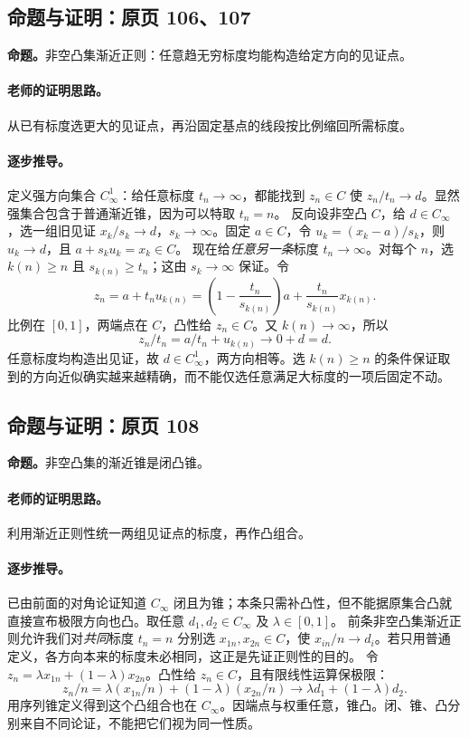 \documentclass[11pt,a4paper]{article}
\theoremstyle{definition}\newtheorem{definition}{定义}\newtheorem{example}{例}
\begin{document}
\subsection{命题与证明：原页 106、107}

\textbf{命题。}非空凸集渐近正则：任意趋无穷标度均能构造给定方向的见证点。

\paragraph{老师的证明思路。}从已有标度选更大的见证点，再沿固定基点的线段按比例缩回所需标度。

\paragraph{逐步推导。}
定义强方向集合 $C^1_\infty$：给任意标度 $t_n\to\infty$，都能找到 $z_n\in C$ 使 $z_n/t_n\to d$。显然强集合包含于普通渐近锥，因为可以特取 $t_n=n$。
反向设非空凸 $C$，给 $d\in C_\infty$，选一组旧见证 $x_k/s_k\to d$，$s_k\to\infty$。固定 $a\in C$，令 $u_k=(x_k-a)/s_k$，则 $u_k\to d$，且 $a+s_ku_k=x_k\in C$。
现在给\emph{任意另一条}标度 $t_n\to\infty$。对每个 $n$，选 $k(n)\ge n$ 且 $s_{k(n)}\ge t_n$；这由 $s_k\to\infty$ 保证。令
\[z_n=a+t_nu_{k(n)}=\left(1-\frac{t_n}{s_{k(n)}}\right)a+\frac{t_n}{s_{k(n)}}x_{k(n)}.\]
比例在 $[0,1]$，两端点在 $C$，凸性给 $z_n\in C$。又 $k(n)\to\infty$，所以
\[z_n/t_n=a/t_n+u_{k(n)}\to0+d=d.\]
任意标度均构造出见证，故 $d\in C^1_\infty$，两方向相等。选 $k(n)\ge n$ 的条件保证取到的方向近似确实越来越精确，而不能仅选任意满足大标度的一项后固定不动。


\subsection{命题与证明：原页 108}

\textbf{命题。}非空凸集的渐近锥是闭凸锥。

\paragraph{老师的证明思路。}利用渐近正则性统一两组见证点的标度，再作凸组合。

\paragraph{逐步推导。}
已由前面的对角论证知道 $C_\infty$ 闭且为锥；本条只需补凸性，但不能据原集合凸就直接宣布极限方向也凸。取任意 $d_1,d_2\in C_\infty$ 及 $\lambda\in[0,1]$。
前条非空凸集渐近正则允许我们对\emph{共同}标度 $t_n=n$ 分别选 $x_{1n},x_{2n}\in C$，使 $x_{in}/n\to d_i$。若只用普通定义，各方向本来的标度未必相同，这正是先证正则性的目的。
令 $z_n=\lambda x_{1n}+(1-\lambda)x_{2n}$。凸性给 $z_n\in C$，且有限线性运算保极限：
\[z_n/n=\lambda(x_{1n}/n)+(1-\lambda)(x_{2n}/n)\to\lambda d_1+(1-\lambda)d_2.\]
用序列锥定义得到这个凸组合也在 $C_\infty$。因端点与权重任意，锥凸。闭、锥、凸分别来自不同论证，不能把它们视为同一性质。
\end{document}
